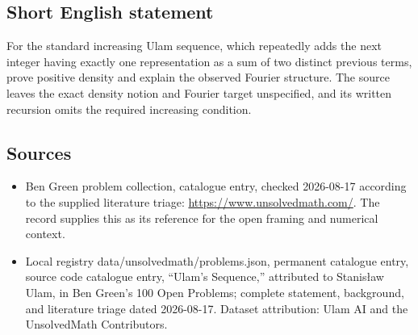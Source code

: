 \documentclass[11pt]{article}
\begin{document}
\subsection{Short English statement}
For the standard increasing Ulam sequence, which repeatedly adds the next integer having exactly one representation as a sum of two distinct previous terms, prove positive density and explain the observed Fourier structure. The source leaves the exact density notion and Fourier target unspecified, and its written recursion omits the required increasing condition.
\subsection{Sources}
\begin{itemize}
\item Ben Green problem collection, catalogue entry, checked 2026-08-17 according to the supplied literature triage: \url{https://www.unsolvedmath.com/}. The record supplies this as its reference for the open framing and numerical context.
\item Local registry data/unsolvedmath/problems.json, permanent catalogue entry, source code catalogue entry, ``Ulam's Sequence,'' attributed to Stanis\l aw Ulam, in Ben Green's 100 Open Problems; complete statement, background, and literature triage dated 2026-08-17. Dataset attribution: Ulam AI and the UnsolvedMath Contributors.
\end{itemize}
\end{document}
